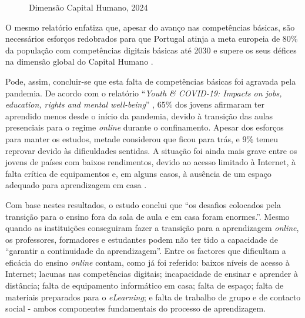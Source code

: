 \begin{figure}[hbtp]
	\centering%
		\centering
		\qquad
		\caption{Dimensão Capital Humano, 2024 \cite{itu2024facts}}%
		\label{fig:capitalhumano}%
	\end{figure}

O mesmo relatório enfatiza que, apesar do avanço nas competências básicas, são necessários esforços redobrados para que Portugal atinja a meta europeia de 80\% da população com competências digitais básicas até 2030 e supere os seus défices na dimensão global do Capital Humano \cite{DESI2024}.

Pode, assim, concluir-se que esta falta de competências básicas foi agravada pela pandemia. De acordo com o relatório ``\textit{Youth \& COVID-19: Impacts on jobs, education, rights and mental well-being}'' \cite{impactocovideducacao}, 65\% dos jovens afirmaram ter aprendido menos desde o início da pandemia, devido à transição das aulas presenciais para o regime \textit{online} durante o confinamento. Apesar dos esforços para manter os estudos, metade considerou que ficou para trás, e 9\% temeu reprovar devido às dificuldades sentidas. A situação foi ainda mais grave entre os jovens de países com baixos rendimentos, devido ao acesso limitado à Internet, à falta crítica de equipamentos e, em alguns casos, à ausência de um espaço adequado para aprendizagem em casa \cite{impactocovideducacao}.

Com base nestes resultados, o estudo conclui que ``os desafios colocados pela transição para o ensino fora da sala de aula e em casa foram enormes.''. Mesmo quando as instituições conseguiram fazer a transição para a aprendizagem \textit{online}, os professores, formadores e estudantes podem não ter tido a capacidade de ``garantir a continuidade da aprendizagem''. Entre os factores que dificultam a eficácia do ensino \textit{online} contam, como já foi referido: baixos níveis de acesso à Internet; lacunas nas competências digitais; incapacidade de ensinar e aprender à distância; falta de equipamento informático em casa; falta de espaço; falta de materiais preparados para o \textit{eLearning}; e falta de trabalho de grupo e de contacto social - ambos componentes fundamentais do processo de aprendizagem.

